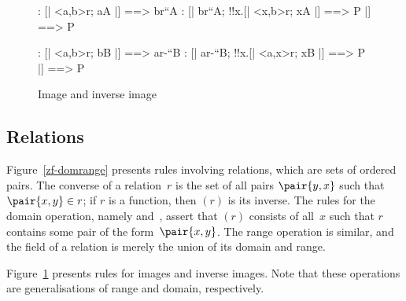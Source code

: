 \begin{figure}
\begin{alltt*}\isastyleminor
{}:      [| <a,b>\isasymin{}r; a\isasymin{}A |] ==> b\isasymin{}r``A
:      [| b\isasymin{}r``A; !!x.[| <x,b>\isasymin{}r; x\isasymin{}A |] ==> P |] ==> P

:     [| <a,b>\isasymin{}r; b\isasymin{}B |] ==> a\isasymin{}r-``B
:     [| a\isasymin{}r-``B; !!x.[| <a,x>\isasymin{}r;  x\isasymin{}B |] ==> P |] ==> P
\end{alltt*}
\caption{Image and inverse image} \label{zf-domrange2}
\end{figure}


\subsection{Relations}
Figure~\ref{zf-domrange} presents rules involving relations, which are sets
of ordered pairs.  The converse of a relation~$r$ is the set of all pairs
$\pair{y,x}$ such that $\pair{x,y}\in r$; if $r$ is a function, then
{$(r)$} is its inverse.  The rules for the domain
operation, namely  and~, assert that
$(r)$ consists of all~$x$ such that $r$ contains
some pair of the form~$\pair{x,y}$.  The range operation is similar, and
the field of a relation is merely the union of its domain and range.  

Figure~\ref{zf-domrange2} presents rules for images and inverse images.
Note that these operations are generalisations of range and domain,
respectively. 



